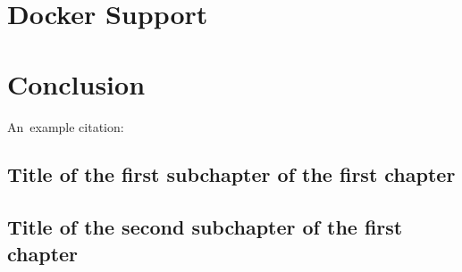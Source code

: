 \documentclass[12pt,a4paper]{report}
\let\openright=\clearpage
\begin{document}
\chapter{Docker Support}
\chapter{Conclusion}
An~example citation: \cite{Andel07}

\section{Title of the first subchapter of the first chapter}

\section{Title of the second subchapter of the first chapter}







\listoffigures

\listoftables



\openright
\end{document}
